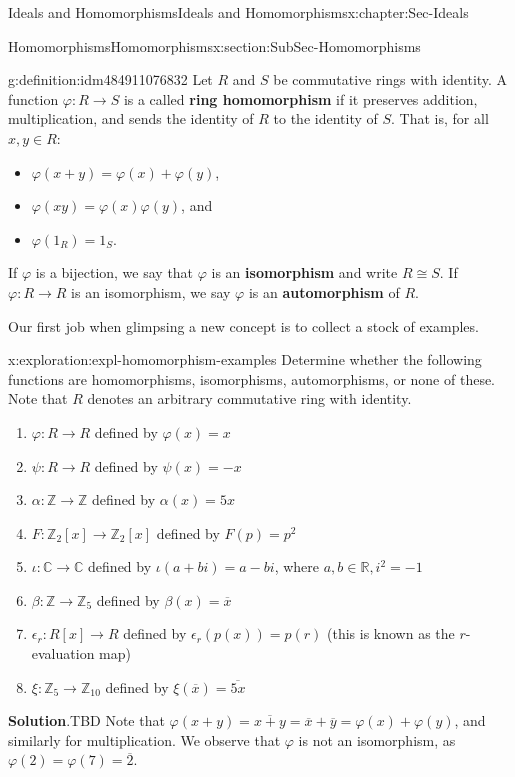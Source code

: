 \documentclass[oneside,10pt,]{book}
\newcommand{\blocktitlefont}{\relax}
\newcommand{\terminology}[1]{\textbf{#1}}
\numberwithin{equation}{section}
\def\p{\varphi}
\def\C{{\mathbb C}}
\def\Z{{\mathbb Z}}
\def\R{{\mathbb R}}
\begin{document}
\begin{chapterptx}{Ideals and Homomorphisms}{}{Ideals and Homomorphisms}{}{}{x:chapter:Sec-Ideals}
\begin{sectionptx}{Homomorphisms}{}{Homomorphisms}{}{}{x:section:SubSec-Homomorphisms}
\begin{introduction}{}
\end{introduction}%
\begin{definition}{}{g:definition:idm484911076832}%
Let \(R\) and \(S\) be commutative rings with identity. A function \(\p : R\to S\) is a called \terminology{ring homomorphism} if it preserves addition, multiplication, and sends the identity of \(R\) to the identity of \(S\). That is, for all \(x,y\in R\):%
\begin{itemize}[label=\textbullet]
\item{}\(\p(x+y) = \p(x) + \p(y)\),%
\item{}\(\p(xy) = \p(x)\p(y)\), and%
\item{}\(\p(1_R) = 1_S\).%
\end{itemize}
If \(\p\) is a bijection, we say that \(\p\) is an \terminology{isomorphism} and write \(R\cong S\). If \(\p : R\to R\) is an isomorphism, we say \(\p\) is an \terminology{automorphism} of \(R\).%
\end{definition}
Our first job when glimpsing a new concept is to collect a stock of examples.%
\begin{exploration}{}{x:exploration:expl-homomorphism-examples}%
Determine whether the following functions are homomorphisms, isomorphisms, automorphisms, or none of these. Note that \(R\) denotes an arbitrary commutative ring with identity.%
%
\begin{enumerate}
\item{}\(\p : R\to R\) defined by \(\p(x)=x\)%
\item{}\(\psi : R\to R\) defined by \(\psi(x)=-x\)%
\item{}\(\alpha : \Z\to \Z\) defined by \(\alpha(x)=5x\)%
\item{}\(F : \Z_2[x]\to \Z_2[x]\) defined by \(F(p) = p^2\)%
\item{}\(\iota : \C\to \C\) defined by \(\iota(a+bi)=a-bi\), where \(a,b\in \R, i^2 = -1\)%
\item{}\(\beta : \Z\to \Z_{5}\) defined by \(\beta(x) = \overline{x}\)%
\item{}\(\epsilon_r : R[x] \to R\) defined by \(\epsilon_r(p(x)) = p(r)\) (this is known as the \(r\)-evaluation map)%
\item{}\(\xi : \Z_5 \to \Z_{10}\) defined by \(\xi(\overline{x}) = \overline{5x}\)%
\end{enumerate}
\par\smallskip%
\noindent\textbf{\blocktitlefont Solution}.\hypertarget{g:solution:idm484911202400}{}\quad{}TBD Note that \(\p(x+y) = \overline{x+y} = \overline{x} + \overline{y} = \p(x) + \p(y)\), and similarly for multiplication. We observe that \(\p\) is not an isomorphism, as \(\p(2) = \p(7) = \overline{2}\).%

\end{exploration}
\end{sectionptx}
\end{chapterptx}
\end{document}
